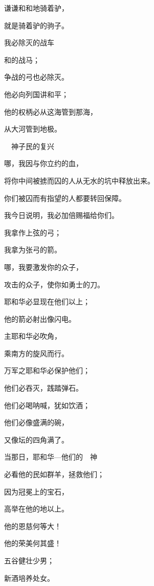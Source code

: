 {\par }{\Q 谦谦和和地骑着驴，
\par }{\Q 就是骑着驴的驹子。
\par }{\Q {}我必除灭{}的战车
\par }{\Q 和{}的战马；
\par }{\Q 争战的弓也必除灭。
\par }{\Q 他必向列国讲和平；
\par }{\Q 他的权柄必从这海管到那海，
\par }{\Q 从大河管到地极。
\par }{\SH 　神子民的复兴
\par }{\Q {}哪，我因与你立约的血，
\par }{\Q 将你中间被掳而囚的人从无水的坑中释放出来。
\par }{\Q {}你们被囚而有指望的人都要转回保障。
\par }{\Q 我今日说明，我必加倍赐福给你们。
\par }{\Q {}我拿{}作上弦的弓；
\par }{\Q 我拿{}为张弓的箭。
\par }{哪，我要激发你的众子，
\par }{\Q 攻击{}的众子，使你如勇士的刀。
\par }{\BB \par }{\Q {}耶和华必显现在他们以上；
\par }{\Q 他的箭必射出像闪电。
\par }{\Q 主耶和华必吹角，
\par }{\Q 乘南方的旋风而行。
\par }{\Q {}万军之耶和华必保护他们；
\par }{\Q 他们必吞灭{}，践踏弹石。
\par }{\Q 他们必喝{}呐喊，犹如饮酒；
\par }{\Q 他们必像盛满{}的碗，
\par }{\Q 又像坛的四角满了{}。
\par }{\BB \par }{\Q {}当那日，耶和华—他们的　神
\par }{\Q 必看他的民如群羊，拯救他们；
\par }{\Q 因为{}冠冕上的宝石，
\par }{\Q 高举在他的地以上。
\par }{\Q {}他的恩慈何等大！
\par }{\Q 他的荣美何其盛！
\par }{\Q 五谷健壮少男；
\par }{\Q 新酒培养处女。

}
